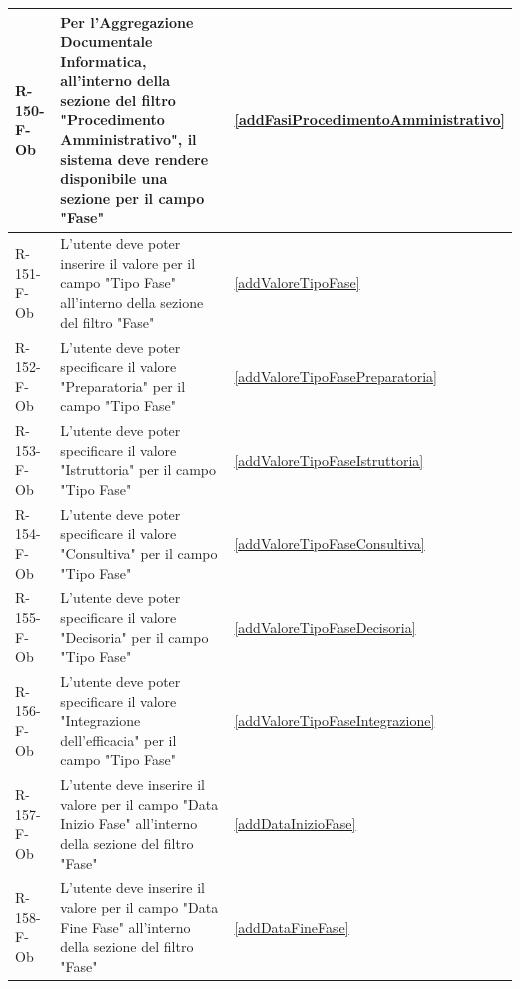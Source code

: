 \begin{longtable}{|p{2.5cm}|p{9.5cm}|p{2.5cm}|}
R-150-F-Ob & Per l'Aggregazione Documentale Informatica, all'interno della sezione del filtro "Procedimento Amministrativo", il sistema deve rendere disponibile una sezione per il campo "Fase" & \ref{addFasiProcedimentoAmministrativo} \\
\hline
R-151-F-Ob & L'utente deve poter inserire il valore per il campo "Tipo Fase" all'interno della sezione del filtro "Fase" & \ref{addValoreTipoFase} \\
\hline
R-152-F-Ob & L'utente deve poter specificare il valore "Preparatoria" per il campo "Tipo Fase" & \ref{addValoreTipoFasePreparatoria} \\
\hline
R-153-F-Ob & L'utente deve poter specificare il valore "Istruttoria" per il campo "Tipo Fase" & \ref{addValoreTipoFaseIstruttoria} \\
\hline
R-154-F-Ob & L'utente deve poter specificare il valore "Consultiva" per il campo "Tipo Fase" & \ref{addValoreTipoFaseConsultiva} \\
\hline
R-155-F-Ob & L'utente deve poter specificare il valore "Decisoria" per il campo "Tipo Fase" & \ref{addValoreTipoFaseDecisoria} \\
\hline
R-156-F-Ob & L'utente deve poter specificare il valore "Integrazione dell'efficacia" per il campo "Tipo Fase" & \ref{addValoreTipoFaseIntegrazione} \\
\hline
R-157-F-Ob & L'utente deve inserire il valore per il campo "Data Inizio Fase" all'interno della sezione del filtro "Fase" & \ref{addDataInizioFase} \\
\hline
R-158-F-Ob & L'utente deve inserire il valore per il campo "Data Fine Fase" all'interno della sezione del filtro "Fase" & \ref{addDataFineFase} \\



\end{longtable}
